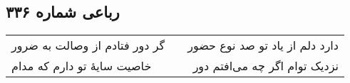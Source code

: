 \begin{center}
\section*{رباعی شماره ۳۳۶}
\label{sec:sh336}
\begin{longtable}{l p{0.5cm} r}
گر دور فتادم از وصالت به ضرور
&&
دارد دلم از یاد تو صد نوع حضور
\\
خاصیت سایهٔ تو دارم که مدام
&&
نزدیک توام اگر چه می‌افتم دور
\\
\end{longtable}
\end{center}

